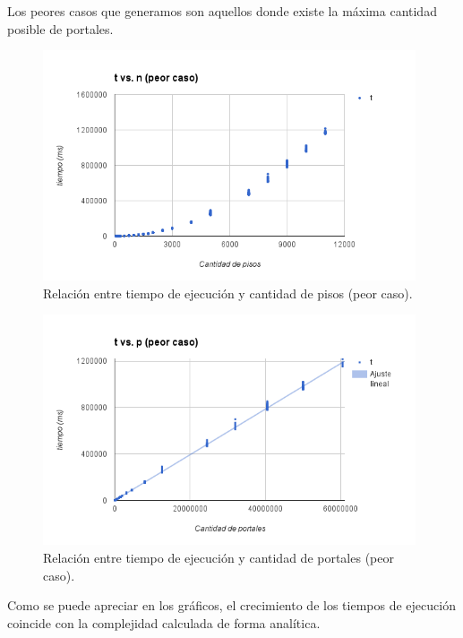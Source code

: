 Los peores casos que generamos son aquellos donde existe la máxima cantidad posible de portales.

 \begin{figure}[h!]
   \begin{center}
 	\includegraphics[width=11cm]{imagenes/ej1/tvsn-peorcaso.png}
	\caption{Relación entre tiempo de ejecución y cantidad de pisos (peor caso).}
	\label{tvsn-peorcasoB}
   \end{center}
 \end{figure}
\begin{figure}[h!]
   \begin{center}
 	\includegraphics[width=11cm]{imagenes/ej1/tvsp-peorcaso.png}
	\caption{Relación entre tiempo de ejecución y cantidad de portales (peor caso).}
	\label{tvsp-peorcasoB}
   \end{center}
 \end{figure}

 
 Como se puede apreciar en los gráficos, el crecimiento de los tiempos de ejecución coincide con la complejidad calculada de forma analítica.
